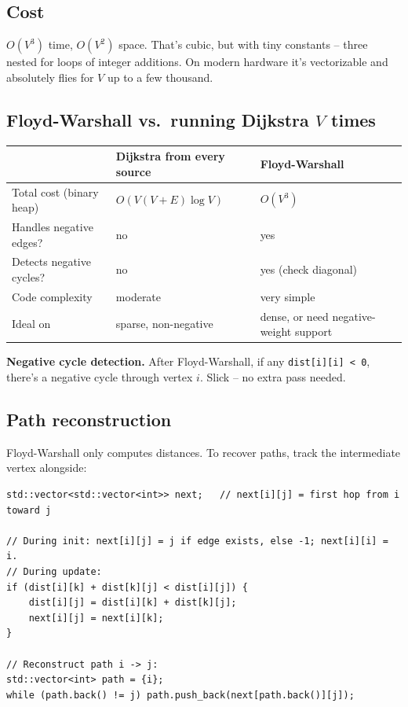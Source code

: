 \documentclass[11pt]{article}
\begin{document}
\subsection*{Cost}

$O(V^3)$ time, $O(V^2)$ space. That's cubic, but with tiny constants -- three nested for loops of integer additions. On modern hardware it's vectorizable and absolutely flies for $V$ up to a few thousand.

\subsection*{Floyd-Warshall vs.\ running Dijkstra $V$ times}

\begin{center}
\begin{tabular}{lll}
\hline
& Dijkstra from every source & Floyd-Warshall \\
\hline
Total cost (binary heap) & $O(V (V+E) \log V)$ & $O(V^3)$ \\
Handles negative edges? & no & yes \\
Detects negative cycles? & no & yes (check diagonal) \\
Code complexity & moderate & very simple \\
Ideal on & sparse, non-negative & dense, or need negative-weight support \\
\hline
\end{tabular}
\end{center}

\begin{warnbox}
\textbf{Negative cycle detection.} After Floyd-Warshall, if any \texttt{dist[i][i] < 0}, there's a negative cycle through vertex $i$. Slick -- no extra pass needed.
\end{warnbox}

\subsection*{Path reconstruction}

Floyd-Warshall only computes distances. To recover paths, track the intermediate vertex alongside:

\begin{lstlisting}[basicstyle=\ttfamily\small,frame=single]
std::vector<std::vector<int>> next;   // next[i][j] = first hop from i toward j

// During init: next[i][j] = j if edge exists, else -1; next[i][i] = i.
// During update:
if (dist[i][k] + dist[k][j] < dist[i][j]) {
    dist[i][j] = dist[i][k] + dist[k][j];
    next[i][j] = next[i][k];
}

// Reconstruct path i -> j:
std::vector<int> path = {i};
while (path.back() != j) path.push_back(next[path.back()][j]);
\end{lstlisting}
\end{document}
